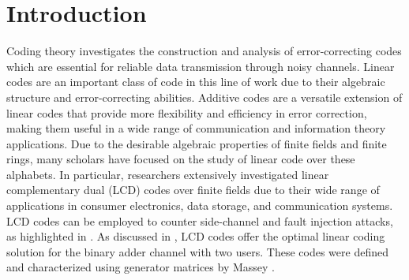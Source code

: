 \documentclass[sn-mathphys-num]{sn-jnl}%
\theoremstyle{thmstyleone}%
\theoremstyle{thmstyletwo}%
\theoremstyle{thmstylethree}%
\begin{document}
\section{Introduction}\label{sec1}
Coding theory investigates the construction and analysis of error-correcting codes which are essential for reliable data transmission through noisy channels. Linear codes are an important class of code in this line of work due to their algebraic structure and error-correcting abilities. Additive codes are a versatile extension of linear codes that provide more flexibility and efficiency in error correction, making them useful in a wide range of communication and information theory applications. Due to the desirable algebraic properties of finite fields and finite rings, many scholars have focused on the study of linear code over these alphabets. In particular, researchers extensively investigated linear complementary dual (LCD) codes over finite fields due to their wide range of applications in consumer electronics, data storage, and communication systems. LCD codes can be employed to counter side-channel and fault injection attacks, as highlighted in \cite{carlet2016}. As discussed in \cite{masseylcd}, LCD codes offer the optimal linear coding solution for the binary adder channel with two users. These codes were defined and characterized using generator matrices by Massey \cite{masseyreversible}.
\end{document}
